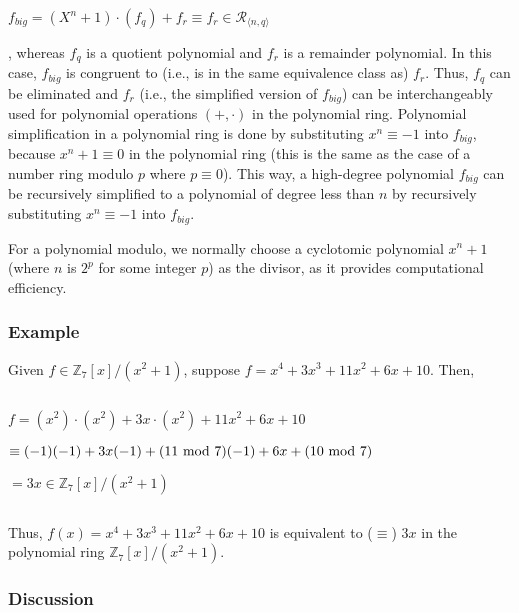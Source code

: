 $f_{big} = (X^n + 1)\cdot(f_q) + f_r \equiv f_r \in \mathcal{R}_{\langle n, q \rangle}$

\noindent, whereas $f_q$ is a quotient polynomial and $f_r$ is a remainder polynomial. In this case, $f_{big}$ is congruent to (i.e., is in the same equivalence class as) $f_r$. Thus, $f_q$ can be eliminated and $f_r$ (i.e., the simplified version of $f_{big}$) can be interchangeably used for polynomial operations $(+, \cdot)$ in the polynomial ring. 
Polynomial simplification in a polynomial ring is done by substituting $x^n \equiv -1$ into $f_{big}$, because $x^n + 1 \equiv 0$ in the polynomial ring (this is the same as the case of a number ring modulo $p$ where $p \equiv 0$). This way, a high-degree polynomial $f_{big}$ can be recursively simplified to a polynomial of degree less than $n$ by recursively substituting $x^n \equiv -1$ into $f_{big}$.

For a polynomial modulo, we normally choose a cyclotomic polynomial $x^n + 1$ (where $n$ is $2^p$ for some integer $p$) as the divisor, as it provides computational efficiency. 

\subsubsection{Example}
\label{subsubsec:poly-ring-ex}
Given $f \in \mathbb{Z}_7[x] / (x^2 + 1)$, suppose $f = x^4 + 3x^3 + 11x^2 + 6x + 10$. Then, 

$ $

$f = (x^2)\cdot(x^2) + 3x\cdot(x^2) + 11x^2 + 6x + 10$ 

$ \equiv (-1)(-1) + 3x(-1) +  (11 \text{ } \text{\text{mod}} \text{ } 7)(-1) + 6x + (10 \text{ } \text{\text{mod}} \text{ } 7)$

$ = 3x \in \mathbb{Z}_7[x] / (x^2 + 1)$

$ $

\noindent Thus, $f(x) = x^4 + 3x^3 + 11x^2 + 6x + 10$ is equivalent to ($\equiv$) $3x$ in the polynomial ring $\mathbb{Z}_7[x] / (x^2 + 1)$.


\subsubsection{Discussion}
\label{subsubsec:polynomial-ring-discuss}

